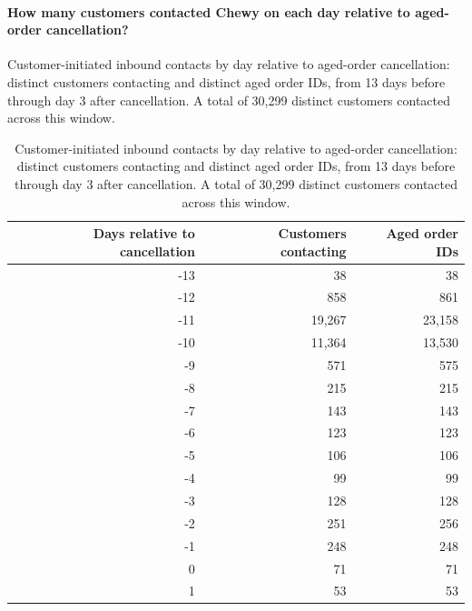 \paragraph{How many customers contacted Chewy on each day relative to aged-order cancellation?}
Customer-initiated inbound contacts by day relative to aged-order cancellation: distinct customers contacting and distinct aged order IDs, from 13 days before through day 3 after cancellation. A total of 30,299 distinct customers contacted across this window.

\begin{table}[!htbp]
\centering
\caption{Customer-initiated inbound contacts by day relative to aged-order cancellation: distinct customers contacting and distinct aged order IDs, from 13 days before through day 3 after cancellation. A total of 30,299 distinct customers contacted across this window.}
\label{tab:aged-customer-contacts-by-cancellation-day}
\begin{tabular}{@{}rrr@{}}
\toprule
Days relative to cancellation & Customers contacting & Aged order IDs \\
\midrule

-13 & 38 & 38 \\

-12 & 858 & 861 \\

-11 & 19,267 & 23,158 \\

-10 & 11,364 & 13,530 \\

-9 & 571 & 575 \\

-8 & 215 & 215 \\

-7 & 143 & 143 \\

-6 & 123 & 123 \\

-5 & 106 & 106 \\

-4 & 99 & 99 \\

-3 & 128 & 128 \\

-2 & 251 & 256 \\

-1 & 248 & 248 \\

0 & 71 & 71 \\

1 & 53 & 53 \\


\end{tabular}
\end{table}
